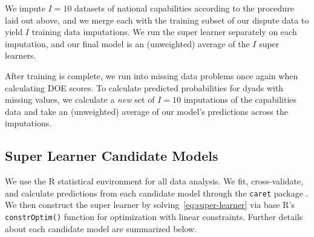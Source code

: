 We impute $I = 10$ datasets of national capabilities according to the procedure laid out above, and we merge each with the training subset of our dispute data to yield $I$ training data imputations.
We run the super learner separately on each imputation, and our final model is an (unweighted) average of the $I$ super learners.

After training is complete, we run into missing data problems once again when calculating DOE scores.
To calculate predicted probabilities for dyads with missing values, we calculate a \emph{new} set of $I = 10$ imputations of the capabilities data and take an (unweighted) average of our model's predictions across the imputations.

\subsection{Super Learner Candidate Models}

We use the R statistical environment  for all data analysis.
We fit, cross-validate, and calculate predictions from each candidate model through the \texttt{caret} package .
We then construct the super learner by solving~\eqref{eq:super-learner} via base R's \texttt{constrOptim()} function for optimization with linear constraints.
Further details about each candidate model are summarized below.

